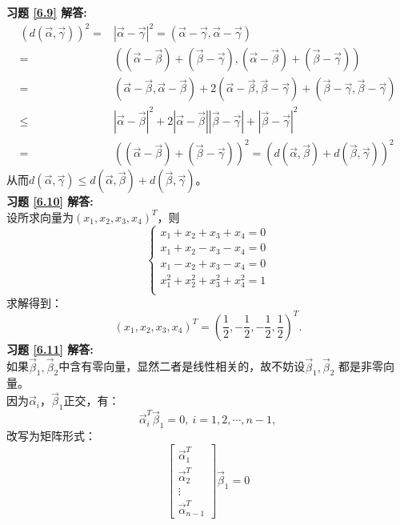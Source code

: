\textbf{习题 \ref{6.9} 解答:}\\
\begin{align*}
(d(\vec{\alpha},\vec{\gamma}))^2=&|\vec{\alpha}-\vec{\gamma}|^2=(\vec{\alpha}-\vec{\gamma},\vec{\alpha}-\vec{\gamma})\\
=&((\vec{\alpha}-\vec{\beta})+(\vec{\beta}-\vec{\gamma}),(\vec{\alpha}-\vec{\beta})+(\vec{\beta}-\vec{\gamma}))\\
=&(\vec{\alpha}-\vec{\beta},\vec{\alpha}-\vec{\beta})+2(\vec{\alpha}-\vec{\beta},\vec{\beta}-\vec{\gamma})+
(\vec{\beta}-\vec{\gamma},\vec{\beta}-\vec{\gamma})\\
\leq&|\vec{\alpha}-\vec{\beta}|^2+2|\vec{\alpha}-\vec{\beta}||\vec{\beta}-\vec{\gamma}|+|\vec{\beta}-\vec{\gamma}|^2\\
=&((\vec{\alpha}-\vec{\beta})+(\vec{\beta}-\vec{\gamma}))^2=(d(\vec{\alpha},\vec{\beta})+d(\vec{\beta},\vec{\gamma}))^2
\end{align*}
从而$d(\vec{\alpha},\vec{\gamma})\leq d(\vec{\alpha},\vec{\beta})+d(\vec{\beta},\vec{\gamma})$。\\
\textbf{习题 \ref{6.10} 解答:}\\
设所求向量为$(x_1,x_2,x_3,x_4)^T$，则
\begin{equation*}
  \begin{cases}
  x_1+x_2+x_3+x_4=0\\
  x_1+x_2-x_3-x_4=0\\
  x_1-x_2+x_3-x_4=0\\
  x_1^2+x_2^2+x_3^2+x_4^2=1\\
  \end{cases}
\end{equation*}
求解得到：
\begin{equation*}
(x_1,x_2,x_3,x_4)^T=(\frac{1}{2},-\frac{1}{2},-\frac{1}{2},\frac{1}{2})^T.
\end{equation*}
\textbf{习题 \ref{6.11} 解答:}\\
如果$\vec{\beta}_1,\vec{\beta}_2$中含有零向量，显然二者是线性相关的，故不妨设$\vec{\beta}_1,\vec{\beta}_2$
都是非零向量。\\
因为$\vec{\alpha}_i$，$\vec{\beta}_1$正交，有：
\begin{equation*}
\vec{\alpha}_i^T\vec{\beta}_1=0,~i=1,2,\cdots,n-1,
\end{equation*}
改写为矩阵形式：
\begin{equation*}
\begin{bmatrix}\vec{\alpha}_1^T\\ \vec{\alpha}_2^T\\ \vdots\\ \vec{\alpha}_{n-1}^T\end{bmatrix}
\vec{\beta}_1=0
\end{equation*}
